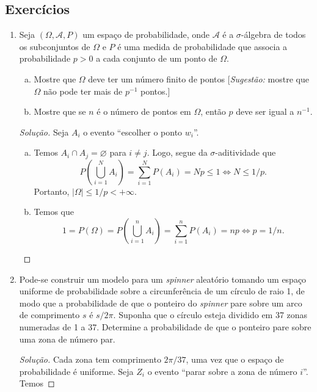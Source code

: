 \documentclass[../Notas.tex]{subfiles}
\begin{document}
\subsection{Exercícios}
\begin{enumerate}
    \item Seja $(\Omega, \mathcal{A}, P)$ um espaço de probabilidade, onde $\mathcal{A}$ é a $\sigma$-álgebra de todos os subconjuntos de $\Omega$ e $P$ é uma medida de probabilidade que associa a probabilidade $p>0$ a cada conjunto de um ponto de $\Omega$.
    \begin{enumerate}[a)]
        \item Mostre que $\Omega$ deve ter um número finito de pontos [\textit{Sugestão:} mostre que $\Omega$ não pode ter mais de $p^{-1}$ pontos.]
        \item Mostre que se $n$ é o número de pontos em $\Omega$, então $p$ deve ser igual a $n^{-1}$.
    \end{enumerate}
    \begin{proof}[Solução]
        Seja $A_i$ o evento ``escolher o ponto $w_i$''.
        \begin{enumerate}[a)]
            \item Temos $A_i\cap A_j = \varnothing$ para $i\neq j$. Logo, segue da $\sigma$-aditividade
            que
            \[
            P\left( \bigcup_{i=1}^N A_i \right) = \sum_{i=1}^N P(A_i) = Np \leq 1 \iff N\leq 1/p.
            \]
            Portanto, $|\Omega| \leq 1/p < +\infty$.
            \item Temos que
            \[
            1 = P(\Omega) = P\left( \bigcup_{i=1}^n A_i \right) = \sum_{i=1}^n P(A_i) = np \iff p = 1/n.
            \]
        \end{enumerate}
    \end{proof}
    \item Pode-se construir um modelo para um \textit{spinner} aleatório tomando um espaço uniforme de probabilidade sobre a circunferência de um círculo de raio 1, de modo que a probabilidade de que o ponteiro do \textit{spinner} pare sobre um arco de comprimento $s$ é $s/2\pi$. Suponha que o círculo esteja dividido em 37 zonas numeradas de 1 a 37. Determine a probabilidade de que o ponteiro pare sobre uma zona de número par.
    \begin{proof}[Solução]
        Cada zona tem comprimento $2\pi/37$, uma vez que o espaço de probabilidade é uniforme. Seja $Z_i$ o
        evento ``parar sobre a zona de número $i$''. Temos

\end{proof}
\end{enumerate}
\end{document}
